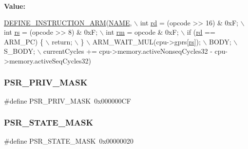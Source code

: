 {\bfseries Value\+:}
\begin{DoxyCode}
\mbox{\hyperlink{isa-arm_8c_a56ae89d1d9edfe3d78f30c0a60273883}{DEFINE\_INSTRUCTION\_ARM}}(\mbox{\hyperlink{inflate_8h_a164ea0159d5f0b5f12a646f25f99eceaa67bc2ced260a8e43805d2480a785d312}{NAME}}, \(\backslash\)
        \textcolor{keywordtype}{int} \mbox{\hyperlink{isa-arm_8c_a555541ce18ed9b5fad657a06b22cb465}{rd}} = (opcode >> 16) & 0xF; \(\backslash\)
        int \mbox{\hyperlink{isa-thumb_8c_a03b78d51ad860bbea2f9c98276d0b70b}{rs}} = (opcode >> 8) & 0xF; \(\backslash\)
        int \mbox{\hyperlink{isa-thumb_8c_a20e40d2fb8c51fa4dd2b4449ad32e111}{rm}} = opcode & 0xF; \(\backslash\)
        if (\mbox{\hyperlink{isa-arm_8c_a555541ce18ed9b5fad657a06b22cb465}{rd}} == ARM\_PC) \{ \(\backslash\)
            return; \(\backslash\)
        \} \(\backslash\)
        ARM\_WAIT\_MUL(cpu->gprs[\mbox{\hyperlink{isa-thumb_8c_a03b78d51ad860bbea2f9c98276d0b70b}{rs}}]); \(\backslash\)
        BODY; \(\backslash\)
        S\_BODY; \(\backslash\)
        currentCycles += cpu->memory.activeNonseqCycles32 - cpu->memory.activeSeqCycles32)
\end{DoxyCode}
\mbox{\label{isa-arm_8c_a808e705b60d550b9aa7f5111d431fc0c}} 
\subsubsection{\texorpdfstring{P\+S\+R\+\_\+\+P\+R\+I\+V\+\_\+\+M\+A\+SK}{PSR\_PRIV\_MASK}}
{\footnotesize\ttfamily \#define P\+S\+R\+\_\+\+P\+R\+I\+V\+\_\+\+M\+A\+SK~0x000000\+CF}

\mbox{\label{isa-arm_8c_ae640bd0b96d0e7e17194658d36c3e441}} 
\subsubsection{\texorpdfstring{P\+S\+R\+\_\+\+S\+T\+A\+T\+E\+\_\+\+M\+A\+SK}{PSR\_STATE\_MASK}}
{\footnotesize\ttfamily \#define P\+S\+R\+\_\+\+S\+T\+A\+T\+E\+\_\+\+M\+A\+SK~0x00000020}

